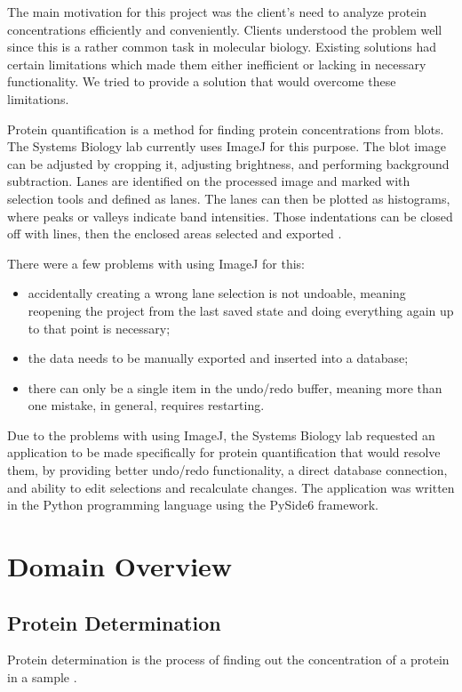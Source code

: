 The main motivation for this project was the client's need to analyze protein concentrations efficiently and conveniently. Clients understood the problem well since this is a rather common task in molecular biology. Existing solutions had certain limitations which made them either inefficient or lacking in necessary functionality. We tried to provide a solution that would overcome these limitations.

Protein quantification is a method for finding protein concentrations from blots. The Systems Biology lab currently uses ImageJ for this purpose. The blot image can be adjusted by cropping it, adjusting brightness, and performing background subtraction. Lanes are identified on the processed image and marked with selection tools and defined as lanes. The lanes can then be plotted as histograms, where peaks or valleys indicate band intensities. Those indentations can be closed off with lines, then the enclosed areas selected and exported \cite{protein-quantification-imagej}.

There were a few problems with using ImageJ for this: 
\begin{itemize}
    \item accidentally creating a wrong lane selection is not undoable, meaning reopening the project from the last saved state and doing everything again up to that point is necessary;
    \item the data needs to be manually exported and inserted into a database;
    \item there can only be a single item in the undo/redo buffer, meaning more than one mistake, in general, requires restarting.
\end{itemize}

Due to the problems with using ImageJ, the Systems Biology lab requested an application to be made specifically for protein quantification that would resolve them, by providing better undo/redo functionality, a direct database connection, and ability to edit selections and recalculate changes. The application was written in the Python programming language using the PySide6 framework.

\section{Domain Overview}

\subsection{Protein Determination}
Protein determination is the process of finding out the concentration of a protein in a sample \cite{protein-determination-food}.

